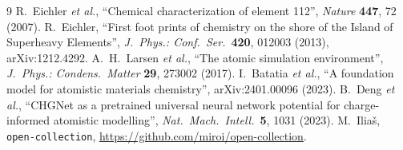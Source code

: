 \documentclass[11pt,a4paper]{article}
\begin{document}
\begin{thebibliography}{9}
 R.~Eichler \emph{et al.}, ``Chemical characterization of element 112'', \emph{Nature}
\textbf{447}, 72 (2007).
 R.~Eichler, ``First foot prints of chemistry on the shore of the Island of Superheavy
Elements'', \emph{J.\ Phys.: Conf.\ Ser.}\ \textbf{420}, 012003 (2013), arXiv:1212.4292.
 A.~H.~Larsen \emph{et al.}, ``The atomic simulation environment'', \emph{J.\ Phys.: Condens.\
Matter} \textbf{29}, 273002 (2017).
 I.~Batatia \emph{et al.}, ``A foundation model for atomistic materials chemistry'',
arXiv:2401.00096 (2023).
 B.~Deng \emph{et al.}, ``CHGNet as a pretrained universal neural network potential for
charge-informed atomistic modelling'', \emph{Nat.\ Mach.\ Intell.}\ \textbf{5}, 1031 (2023).
\bibitem{repo} M.~Ilia\v{s}, \texttt{open-collection}, \url{https://github.com/miroi/open-collection}.
\end{thebibliography}
\end{document}
